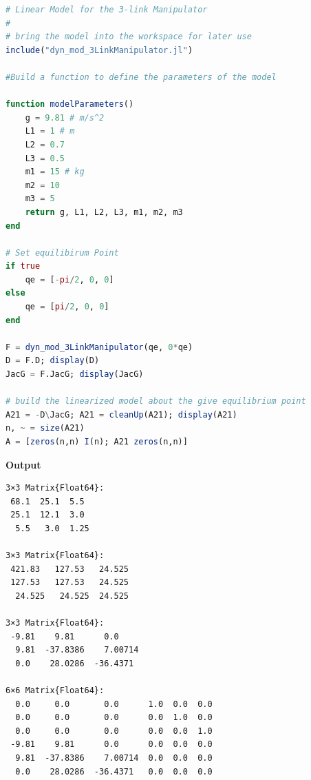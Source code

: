 \begin{lstlisting}[language=Julia,style=mystyle]
# Linear Model for the 3-link Manipulator
#
# bring the model into the workspace for later use
include("dyn_mod_3LinkManipulator.jl") 

#Build a function to define the parameters of the model

function modelParameters()
    g = 9.81 # m/s^2
    L1 = 1 # m
    L2 = 0.7
    L3 = 0.5
    m1 = 15 # kg
    m2 = 10
    m3 = 5    
    return g, L1, L2, L3, m1, m2, m3
end

# Set equilibirum Point
if true
    qe = [-pi/2, 0, 0]
else
    qe = [pi/2, 0, 0]
end

F = dyn_mod_3LinkManipulator(qe, 0*qe)
D = F.D; display(D)
JacG = F.JacG; display(JacG)

# build the linearized model about the give equilibrium point
A21 = -D\JacG; A21 = cleanUp(A21); display(A21)
n, ~ = size(A21)
A = [zeros(n,n) I(n); A21 zeros(n,n)]

\end{lstlisting}
\textbf{Output} 
\begin{verbatim}
3×3 Matrix{Float64}:
 68.1  25.1  5.5
 25.1  12.1  3.0
  5.5   3.0  1.25
  
3×3 Matrix{Float64}:
 421.83   127.53   24.525
 127.53   127.53   24.525
  24.525   24.525  24.525
  
3×3 Matrix{Float64}:
 -9.81    9.81      0.0
  9.81  -37.8386    7.00714
  0.0    28.0286  -36.4371
  
6×6 Matrix{Float64}:
  0.0     0.0       0.0      1.0  0.0  0.0
  0.0     0.0       0.0      0.0  1.0  0.0
  0.0     0.0       0.0      0.0  0.0  1.0
 -9.81    9.81      0.0      0.0  0.0  0.0
  9.81  -37.8386    7.00714  0.0  0.0  0.0
  0.0    28.0286  -36.4371   0.0  0.0  0.0
\end{verbatim}
    \Qed

    \bigskip

